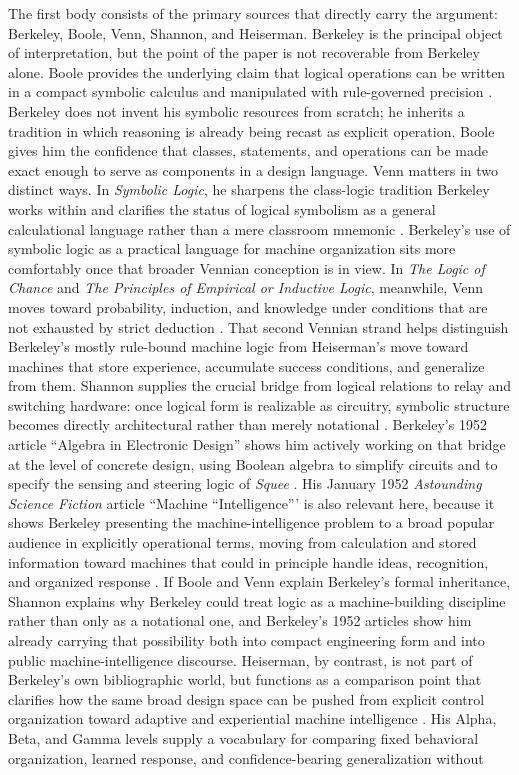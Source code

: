 \documentclass[11pt]{article}
\begin{document}
The first body consists of the primary sources that directly carry the argument: Berkeley, Boole, Venn, Shannon, and Heiserman. Berkeley is the principal object of interpretation, but the point of the paper is not recoverable from Berkeley alone. Boole provides the underlying claim that logical operations can be written in a compact symbolic calculus and manipulated with rule-governed precision \citep{boole1847mathematical,boole1854laws}. Berkeley does not invent his symbolic resources from scratch; he inherits a tradition in which reasoning is already being recast as explicit operation. Boole gives him the confidence that classes, statements, and operations can be made exact enough to serve as components in a design language. Venn matters in two distinct ways. In \emph{Symbolic Logic}, he sharpens the class-logic tradition Berkeley works within and clarifies the status of logical symbolism as a general calculational language rather than a mere classroom mnemonic \citep{venn1894symbolic}. Berkeley's use of symbolic logic as a practical language for machine organization sits more comfortably once that broader Vennian conception is in view. In \emph{The Logic of Chance} and \emph{The Principles of Empirical or Inductive Logic}, meanwhile, Venn moves toward probability, induction, and knowledge under conditions that are not exhausted by strict deduction \citep{venn1866chance,venn1889empirical}. That second Vennian strand helps distinguish Berkeley's mostly rule-bound machine logic from Heiserman's move toward machines that store experience, accumulate success conditions, and generalize from them. Shannon supplies the crucial bridge from logical relations to relay and switching hardware: once logical form is realizable as circuitry, symbolic structure becomes directly architectural rather than merely notational \citep{shannon1938symbolic}. Berkeley's 1952 article ``Algebra in Electronic Design'' shows him actively working on that bridge at the level of concrete design, using Boolean algebra to simplify circuits and to specify the sensing and steering logic of \emph{Squee} \citep{berkeley1952algebra}. His January 1952 \emph{Astounding Science Fiction} article ``Machine ``Intelligence''' is also relevant here, because it shows Berkeley presenting the machine-intelligence problem to a broad popular audience in explicitly operational terms, moving from calculation and stored information toward machines that could in principle handle ideas, recognition, and organized response \citep{berkeley1952machineintelligence}. If Boole and Venn explain Berkeley's formal inheritance, Shannon explains why Berkeley could treat logic as a machine-building discipline rather than only as a notational one, and Berkeley's 1952 articles show him already carrying that possibility both into compact engineering form and into public machine-intelligence discourse. Heiserman, by contrast, is not part of Berkeley's own bibliographic world, but functions as a comparison point that clarifies how the same broad design space can be pushed from explicit control organization toward adaptive and experiential machine intelligence \citep{heiserman1981robot}. His Alpha, Beta, and Gamma levels supply a vocabulary for comparing fixed behavioral organization, learned response, and confidence-bearing generalization without 
\end{document}
